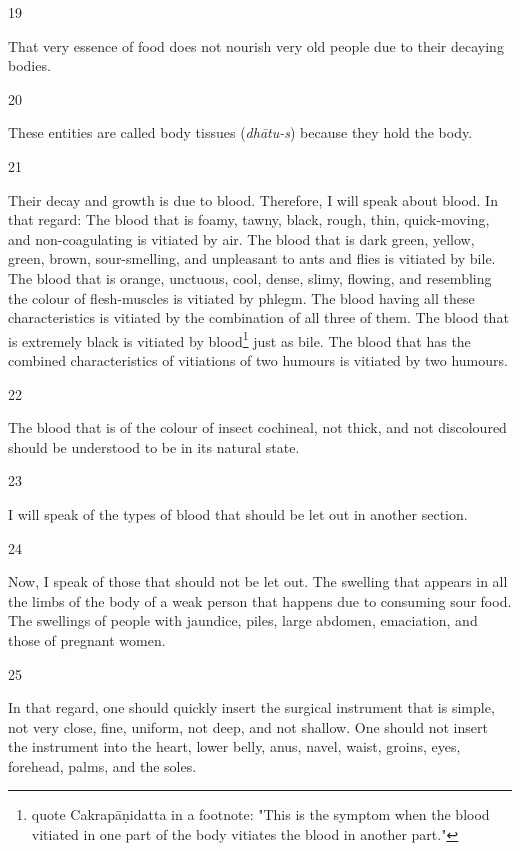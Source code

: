 \begin{translation}
\item[19]

That very essence of food does not nourish very old people due to their decaying bodies.

\item [20]

These entities are called body tissues (\emph{dhātu-s}) because they hold the body. 

\item[21]

Their decay and growth is due to blood. Therefore, I will speak about blood. 
In that regard: The blood that is foamy, tawny, black, rough, thin, quick-moving, and non-coagulating is vitiated by air. The blood that is dark green, yellow, green, brown, sour-smelling, and unpleasant to ants and flies is vitiated by bile. The blood that is orange, unctuous, cool, dense, slimy, flowing, and resembling the colour of flesh-muscles is vitiated by phlegm. The blood having all these characteristics is vitiated by the combination of all three of them. The blood that is extremely black is vitiated by blood\footnote{\citet[64]{vulgate} quote Cakrapāṇidatta in a footnote: "This is the symptom when the blood vitiated in one part of the body vitiates the blood in another part."} just as bile. The blood that has the combined characteristics of vitiations of two humours is vitiated by two humours.

\item[22]

The blood that is of the colour of insect cochineal, not thick, and not discoloured should be understood to be in its natural state. 

\item[23]

I will speak of the types of blood that should be let out in another section. 

\item[24]

Now, I speak of those that should not be let out.
The swelling that appears in all the limbs of the body of a weak person that happens due to consuming sour food. The swellings of people with jaundice, piles, large abdomen, emaciation, and those of pregnant women.

\item[25]

In that regard, one should quickly insert the surgical instrument that is simple, not very close, fine, uniform, not deep, and not shallow. 
One should not insert the instrument into the heart, lower belly, anus, navel, waist, groins, eyes, forehead, palms, and the soles.


\end{translation}
